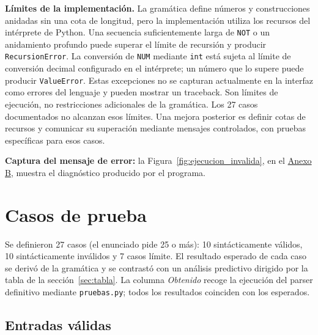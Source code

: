 \documentclass[10pt,a4paper]{article}
\newcommand{\tm}[1]{\texttt{#1}}                                          %
\begin{document}
\textbf{Límites de la implementación.} La gramática define números y construcciones anidadas
sin una cota de longitud, pero la implementación utiliza los recursos del intérprete de Python.
Una secuencia suficientemente larga de \tm{NOT} o un anidamiento profundo puede superar el
límite de recursión y producir \tm{RecursionError}. La conversión de \tm{NUM} mediante \tm{int}
está sujeta al límite de conversión decimal configurado en el intérprete; un número que lo
supere puede producir \tm{ValueError}. Estas excepciones no se capturan actualmente en la
interfaz como errores del lenguaje y pueden mostrar un traceback. Son límites de ejecución,
no restricciones adicionales de la gramática. Los 27 casos documentados no alcanzan esos límites.
Una mejora posterior es definir cotas de recursos y comunicar su superación mediante mensajes
controlados, con pruebas específicas para esos casos.

\textbf{Captura del mensaje de error:}
la Figura~\ref{fig:ejecucion_invalida}, en el
\hyperlink{anexoB}{Anexo B}, muestra el diagnóstico
producido por el programa.


\section{Casos de prueba}
\label{sec:pruebas}

Se definieron 27 casos (el enunciado pide 25 o más): 10 sintácticamente válidos, 10 sintácticamente inválidos y 7 casos
límite. El resultado esperado de cada caso se derivó de la gramática y se contrastó con un análisis predictivo dirigido
por la tabla de la sección~\ref{sec:tabla}. La columna \emph{Obtenido} recoge la ejecución del parser definitivo mediante \tm{pruebas.py}; todos los resultados coinciden con los esperados.

\subsection{Entradas válidas}
\end{document}
